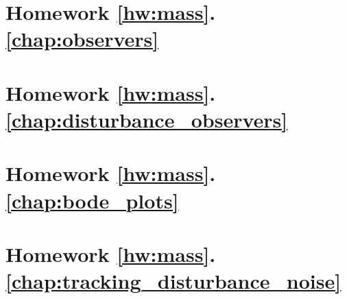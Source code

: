 	\section*{
		Homework \ref{hw:mass}.\ref{chap:observers}}  \label{hw:mass_observer}
		
	\section*{
		Homework \ref{hw:mass}.\ref{chap:disturbance_observers}}  \label{hw:mass_disturbance_observer}
		
	\section*{
		Homework \ref{hw:mass}.\ref{chap:bode_plots}}  \label{hw:mass_bode}
		
	\section*{
		Homework \ref{hw:mass}.\ref{chap:tracking_disturbance_noise}}  \label{hw:mass_loopgain}
		
